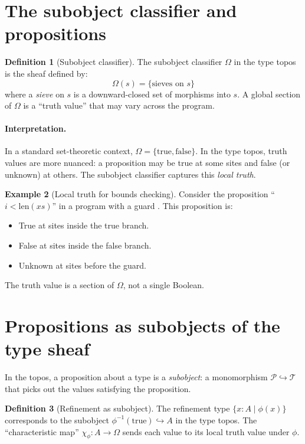 \documentclass[11pt]{report}
\DeclareRobustCommand{\py}[1]{\texttt{\detokenize{#1}}}
\theoremstyle{definition}
\newtheorem{definition}{Definition}[section]
\newtheorem{example}[definition]{Example}
\theoremstyle{plain}
\begin{document}
\section{The subobject classifier and propositions}

\begin{definition}[Subobject classifier]
The subobject classifier $\Omega$ in the type topos is the sheaf defined by:
\[
  \Omega(s) = \{\text{sieves on } s\}
\]
where a \emph{sieve} on $s$ is a downward-closed set of morphisms into $s$.
A global section of $\Omega$ is a ``truth value'' that may vary across the
program.
\end{definition}

\paragraph{Interpretation.}
In a standard set-theoretic context, $\Omega = \{\mathrm{true},
\mathrm{false}\}$. In the type topos, truth values are more nuanced: a
proposition may be true at some sites and false (or unknown) at others. The
subobject classifier captures this \emph{local truth}.

\begin{example}[Local truth for bounds checking]
Consider the proposition ``$i < \mathrm{len}(xs)$'' in a program with
a guard \py{if i < len(xs)}. This proposition is:
\begin{itemize}[nosep]
  \item True at sites inside the true branch.
  \item False at sites inside the false branch.
  \item Unknown at sites before the guard.
\end{itemize}
The truth value is a section of $\Omega$, not a single Boolean.
\end{example}

\section{Propositions as subobjects of the type sheaf}

In the topos, a proposition about a type is a \emph{subobject}: a
monomorphism $\mathcal{P} \hookrightarrow \mathcal{T}$ that picks out the
values satisfying the proposition.

\begin{definition}[Refinement as subobject]
The refinement type $\{x : A \mid \phi(x)\}$ corresponds to the subobject
$\phi^{-1}(\mathrm{true}) \hookrightarrow A$ in the type topos. The
``characteristic map'' $\chi_\phi : A \to \Omega$ sends each value to its
local truth value under $\phi$.
\end{definition}
\end{document}
